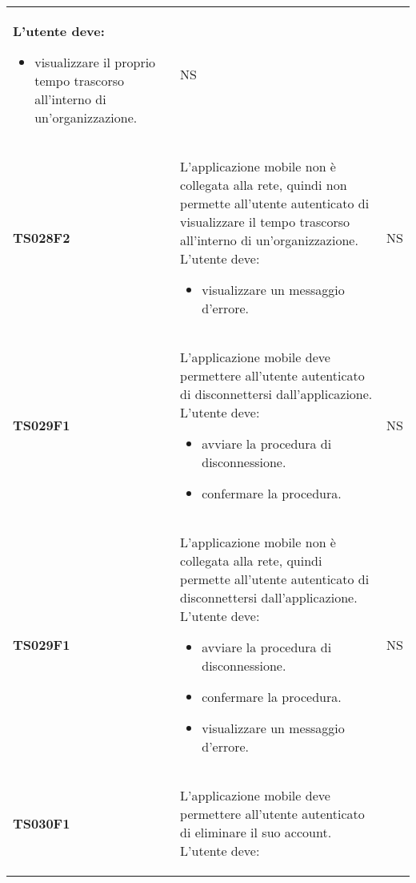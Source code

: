 \documentclass[../piano-di-qualifica.tex]{subfiles}
\begin{document}
\begin{centering}
\begin{longtable}[H]{>{\centering\bfseries}m{3cm} >{}p{10cm} >{\centering\arraybackslash}m{3cm}}
                      L'utente deve:
                      \begin{itemize}
                        \item visualizzare il proprio tempo trascorso all'interno di un'organizzazione.
                      \end{itemize}
                    & NS \\
        TS028F2     & L'applicazione mobile non è collegata alla rete, quindi non permette all'utente autenticato di visualizzare il tempo trascorso all'interno di un'organizzazione. \newline
                      L'utente deve:
                      \begin{itemize}
                        \item visualizzare un messaggio d'errore.
                      \end{itemize}
                    & NS \\
        TS029F1     & L'applicazione mobile deve permettere all'utente autenticato di disconnettersi dall'applicazione. \newline
                      L'utente deve:
                      \begin{itemize}
                        \item avviare la procedura di disconnessione.
                        \item confermare la procedura.
                      \end{itemize}
                    & NS \\
        TS029F1     & L'applicazione mobile non è collegata alla rete, quindi permette all'utente autenticato di disconnettersi dall'applicazione. \newline
                      L'utente deve:
                      \begin{itemize}
                        \item avviare la procedura di disconnessione.
                        \item confermare la procedura.
                        \item visualizzare un messaggio d'errore.
                      \end{itemize}
                    & NS \\
        TS030F1     & L'applicazione mobile deve permettere all'utente autenticato di eliminare il suo account. \newline
                      L'utente deve:
                      \begin{itemize}

\end{itemize}
\end{longtable}
\end{centering}
\end{document}
